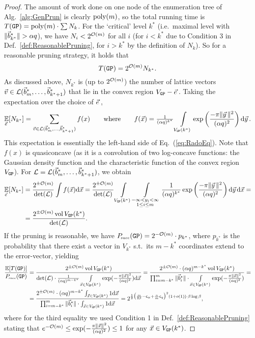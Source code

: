 \begin{proof}
	The amount of work done on one node of the enumeration tree of Alg.~\ref{alg:GenPrun} is clearly $\mathrm{poly}(m)$, so the total running time is $T(\texttt{GP}) = \mathrm{poly}(m) \cdot \sum N_k$. For the `critical' level $k^*$ (i.e.\ maximal level with $\| \vec b^*_{k^*} \| > \alpha q$), we have $N_i < 2^{\mathcal{O}(m)}$ for all $i$ (for $i<k^*$ due to Condition 3 in Def.~\ref{def:ReasonablePruning}, for $i>k^*$ by the definition of $N_k$). So for a reasonable pruning strategy, it holds that
	\[
		T(\texttt{GP}) = 2^{\mathcal{O}(m)} N_{k^*}.
	\]
	As discussed above, $N_{k^*}$ is (up to $2^{\mathcal{O}(m)}$) the number of lattice vectors $\vvec \in \Lat (\wbvec_m, \ldots, \wbvec_{k^* +1})$ that lie in the convex region $V_{\GP} - \evec$. Taking the expectation over the choice of $\evec$, 
	\[
		\E_{\evec}[N_{k^*}] = \sum_{\vvec \in \Lat (\wbvec_m, \ldots, \wbvec_{k^* +1})} f(x) \qquad \text{where} \qquad f(\xvec) = \tfrac{1}{(\alpha q)^{k^*}} \int\limits_{V_{\GP}(k^*)} \exp \left( \frac{-\pi \| \yvec \|^2}{(\alpha q)^2} \right) \d \yvec.
	\]
	This expectation is essentially the left-hand side of Eq.~(\ref{eq:RadoEq}). Note that $f(x)$ is quasiconcave (as it is a convolution of two log-concave functions: the Gaussian density function and the characteristic function of the convex region $V_{\texttt{GP}}$). For $\mathcal{L} = \mathcal{L}(\vec b^*_m, \ldots, \vec b^*_{k^* +1})$, we obtain
	\begin{align*}
			\E_{\evec}[N_{k^*}] &= \frac{2^{\pm \bigO(m)}}{\det (\Lat)} \int f(\xvec) \d \xvec = 
			\frac{2^{\pm \bigO(m)}}{\det (\Lat)} \int\limits_{V_{\GP}(k^*)} \int\limits_{\substack{ - \infty < y_i < \infty \\ 1 \leq i \leq m }} \frac{1}{(\alpha q)^{k^*}} \exp \left( \frac{-\pi \| \yvec \|^2}{(\alpha q)^2} \right) \d \yvec \d \xvec =  \\
			&= \frac{2^{\pm \bigO(m)} \vol V_{\GP}(k^*)}{\det (\Lat)}.  
	\end{align*}
	If the pruning is reasonable, we have $P\mkern-4mu_{\mbox{\tiny succ}}(\texttt{GP}) = 2^{-\mathcal{O}(m)} \cdot p_{k^*}$, where $p_{k^*}$ is the probability that there exist a vector in $V_{k^*}$ s.t.\ its $m-k^*$ coordinates extend to the \LWE error-vector, yielding
	\begin{align*}
		\frac{\operatorname*{\mathbb{E}}[T(\texttt{GP})]}{P\mkern-4mu_{\mbox{\tiny succ}}(\texttt{GP})} &= \frac{2^{\pm \mathcal{O}(m)} \operatorname{\mathrm{vol}} V_{\texttt{GP}}(k^*)}{\det (\mathcal{L}) \cdot \tfrac{1}{(\alpha q)^{m-k^*}} \int\limits_{\vec x \in V_{\texttt{GP}}(k^*)} \exp(- \tfrac{\pi \| \vec x \|^2}{(\alpha q)^2}) \mathrm{d} \vec x} = 
		\frac{2^{\pm \mathcal{O}(m)} \cdot (\alpha q)^{m-k^*} \operatorname{\mathrm{vol}} V_{\texttt{GP}}(k^*) }{\prod_{i=m-k^*}^m \| \vec b^*_i \| \cdot \int\limits_{\vec x \in V_{\texttt{GP}}(k^*)} \exp(- \tfrac{\pi \| \vec x \|^2}{(\alpha q)^2})} = \\
		&= \frac{2^{\pm \mathcal{O}(m)} \cdot (\alpha q)^{m-k^*} \int_{\vec x \in V_{\texttt{GP}}(k^*)} 1 \mathrm{d} \vec x}{\prod_{i=m-k^*}^m \| \vec b^*_i \| \cdot \int_{\vec x \in V_{\texttt{GP}}(k^*)} 1 \mathrm{d} \vec x} = 
		2^{\frac{1}{2} \bigl(\frac{m}{2\beta}-\mathsf{c}_{\alpha} + \frac{n}{m} \mathsf{c}_q  \bigr)^2 (1+o(1)) \cdot \beta\log\beta},
	\end{align*} 
	where for the third equality we used Condition 1 in Def.~\ref{def:ReasonablePruning} stating that $e^{-\mathcal{O}(m)} \leq \exp(- \tfrac{\pi \| \vec x \|^2}{(\alpha q)^2}) \leq 1$ for any $\vec x \in V_{\texttt{GP}}(k^*)$.
\end{proof}

